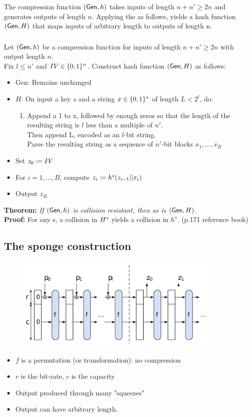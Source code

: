 \documentclass[12pt]{article}
\begin{document}
The compression function $(\operatorname{\mathsf{Gen}}, h)$ takes inputs of length $n+n' \ge 2n$ and generates outputs of length $n$.
Applying the \mdt as follows, yields a hash function $(\operatorname{\mathsf{Gen}}, H)$ that maps inputs of arbitrary length to outputs of length n.
\newpage
\subsubsection{\mdt}
Let $(\operatorname{\mathsf{Gen}}, h)$ be a compression function for inputs of length $n+n' \ge 2n$ with output length $n$. \\
Fix $l \le n'$ and $IV\in \{0, 1\}^n$. Construct hash function $(\operatorname{\mathsf{Gen}}, H)$ as follows:
\begin{itemize}
\item Gen: Remains unchanged
\item $H$: On input a key $s$ and a string $x \in \{0, 1\}^*$ of length $L < 2^l$, do:
	\begin{enumerate}
	\item Append a 1 to x, followed by enough zeros so that the length of the resulting string is $l$ less than a multiple of $n'$.\\
	Then append L, encoded as an $l$-bit string.\\
	Parse the resulting string as a sequence of $n'$-bit blocks $x_1,\dots,x_B$
	\end{enumerate}
\item Set $z_0\coloneqq IV$
\item For $i=1,\dots,B$, compute $z_i\coloneqq h^s(z_{i-1}||x_i)$
\item Output $z_B$\\
\end{itemize}

\textbf{Theorem:} \emph{If $(\operatorname{\mathsf{Gen}},h)$ is collision resistant, then so is $(\operatorname{\mathsf{Gen}},H)$}.\\
\textbf{Proof:} For any s, a collision in $H^s$ yields a collision in $h^s$. (p.171 reference book)


\subsection{The sponge construction}
\begin{figure}[ht]
    \centering
    \includegraphics[width=10cm]{figures/f1.png}
\end{figure}
\begin{itemize}
\item $f$ is a permutation (or transformation): no compression
\item $r$ is the bit-rate, $c$ is the capacity
\item Output produced through many "squeezes"
\item Output can have arbitrary length.
\end{itemize}
\newpage
\end{document}
